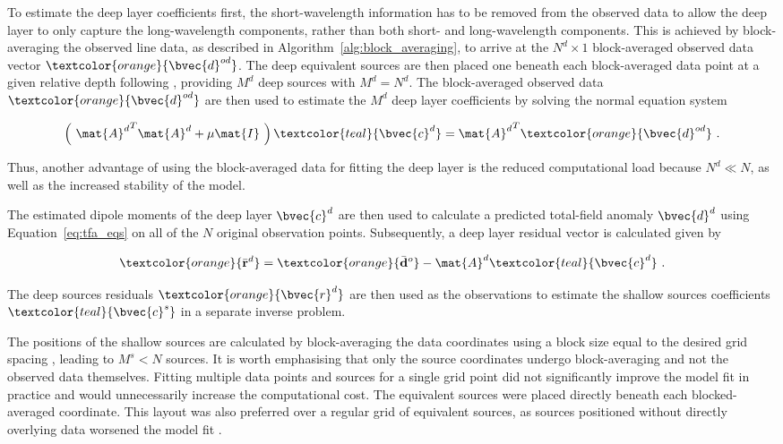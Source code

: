 To estimate the deep layer coefficients first, the short-wavelength information has to be removed from the observed data to allow the deep layer to only capture the long-wavelength components, rather than both short- and long-wavelength components. This is achieved by block-averaging the observed line data, as described in Algorithm~\ref{alg:block_averaging}, to arrive at the $N^d \times 1$ block-averaged observed data vector $\textcolor{orange}{\bvec{d}^{od}}$. The deep equivalent sources are then placed one beneath each block-averaged data point at a given relative depth following \citet{Soler2021}, providing $M^d$ deep sources with $M^d = N^d$. The block-averaged observed data $\textcolor{orange}{\bvec{d}^{od}}$ are then used to estimate the $M^d$ deep layer coefficients by solving the normal equation system

\begin{equation}
    \left(\ {\mat{A}^d}^T \mat{A}^d + \mu \mat{I}\ \right) 
    \textcolor{teal}{\bvec{c}^d} =
    {\mat{A}^d}^T\textcolor{orange}{\bvec{d}^{od}}
    \ .
\end{equation}

\noindent
Thus, another advantage of using the block-averaged data for fitting the deep layer is the reduced computational load because $N^d \ll N$, as well as the increased stability of the model. 

The estimated dipole moments of the deep layer \textcolor{teal}{$\bvec{c}^d$} are then used to calculate a predicted total-field anomaly \textcolor{orange}{$\bvec{d}^d$} using Equation~\ref{eq:tfa_eqs} on all of the $N$ original observation points. Subsequently, a deep layer residual vector is calculated given by

\begin{equation}
    \textcolor{orange}{\bar{\mathbf{r}}^d} = 
    \textcolor{orange}{\bar{\mathbf{d}}^o} - \mat{A}^d \textcolor{teal}{\bvec{c}^d}
    \ .
    \label{eq:deep_residual}
\end{equation}

\noindent
The deep sources residuals $\textcolor{orange}{\bvec{r}^d}$ are then used as the observations to estimate the shallow sources coefficients $\textcolor{teal}{\bvec{c}^s}$ in a separate inverse problem. 

The positions of the shallow sources are calculated by block-averaging the data coordinates using a block size equal to the desired grid spacing \citep{Soler2021}, leading to $M^s < N$ sources. It is worth emphasising that only the source coordinates undergo block-averaging and not the observed data themselves. Fitting multiple data points and sources for a single grid point did not significantly improve the model fit in practice and would unnecessarily increase the computational cost. The equivalent sources were placed directly beneath each blocked-averaged coordinate. This layout was also preferred over a regular grid of equivalent sources, as sources positioned without directly overlying data worsened the model fit \citep{Soler2021}. 

